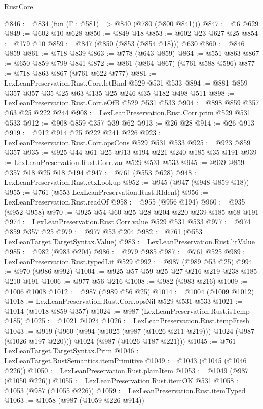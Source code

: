 \begin{lexlean}{RustCore}
\begin{coremodule}
@846 := @834 (fun (Γ : @581) => @840 (@780 (@800 @841)))
@847 := @6 @629
@849 := @602 @10 @628
@850 := @849 @18
@853 := @602 @23 @627 @25
@854 := @179 @10
@859 := @847 (@850 (@853 (@854 @18))) @630
@860 := @846 @859
@861 := @718 @839
@863 := @778 (@643 @859)
@864 := @551 @863
@867 := @650 @859 @799 @841
@872 := @861 (@864 @867) (@761 @588 @596)
@877 := @718 @863 @867 (@761 @622 @777)
@881 := LexLeanPreservation.Rust.Corr.letBind @529 @531 @533
@894 := @881 @859 @357 @357 @35 @25 @63 @135 @25 @246 @35 @182 @498 @511
@898 := LexLeanPreservation.Rust.Corr.eOfB @529 @531 @533
@904 := @898 @859 @357 @63 @25 @222 @244
@908 := LexLeanPreservation.Rust.Corr.prim @529 @531 @533
@912 := @908 @859 @357 @39 @62
@913 := @26 @28
@914 := @26 @913
@919 := @912 @914 @25 @222 @241 @226
@923 := LexLeanPreservation.Rust.Corr.opsCons @529 @531 @533
@925 := @923 @859 @357
@935 := @925 @44 @61 @25 @913 @194 @221 @240 @185 @35 @191
@939 := LexLeanPreservation.Rust.Corr.var @529 @531 @533
@945 := @939 @859 @357 @18 @25 @18 @194
@947 := @761 (@553 @628)
@948 := LexLeanPreservation.Rust.ctxLookup
@952 := @945 (@947 (@948 @859 @18))
@955 := @761 (@553 LexLeanPreservation.Rust.RIdent)
@956 := LexLeanPreservation.Rust.readOf
@958 := @955 (@956 @194)
@960 := @935 (@952 @958)
@970 := @925 @54 @60 @25 @28 @204 @220 @239 @185 @68 @191
@974 := LexLeanPreservation.Rust.Corr.value @529 @531 @533
@977 := @974 @859 @357 @25
@979 := @977 @53 @204
@982 := @761 (@553 LexLeanTarget.TargetSyntax.Value)
@983 := LexLeanPreservation.Rust.litValue
@985 := @982 (@983 @204)
@986 := @979 @985
@987 := @761 @525
@989 := LexLeanPreservation.Rust.typedLit @529
@992 := @987 (@989 @53 @25)
@994 := @970 (@986 @992)
@1004 := @925 @57 @59 @25 @27 @216 @219 @238 @185 @210 @191
@1006 := @977 @56 @216
@1008 := @982 (@983 @216)
@1009 := @1006 @1008
@1012 := @987 (@989 @56 @25)
@1014 := @1004 (@1009 @1012)
@1018 := LexLeanPreservation.Rust.Corr.opsNil @529 @531 @533
@1021 := @1014 (@1018 @859 @357)
@1024 := @987 (LexLeanPreservation.Rust.isTemp @185)
@1025 := @1021 @1024
@1026 := LexLeanPreservation.Rust.tempFresh
@1043 := @919
    (@960
      (@994 (@1025 (@987 (@1026 @211 @219))) @1024 (@987 (@1026 @197 @220)))
      @1024
      (@987 (@1026 @187 @221)))
@1045 := @761 LexLeanTarget.TargetSyntax.Prim
@1046 := LexLeanTarget.RustSemantics.itemPrimitive
@1049 := @1043 (@1045 (@1046 @226))
@1050 := LexLeanPreservation.Rust.plainItem
@1053 := @1049 (@987 (@1050 @226))
@1055 := LexLeanPreservation.Rust.itemOK @531
@1058 := @1053 (@987 (@1055 @226))
@1059 := LexLeanPreservation.Rust.itemTyped
@1063 := @1058 (@987 (@1059 @226 @914))

\end{coremodule}
\end{lexlean}

